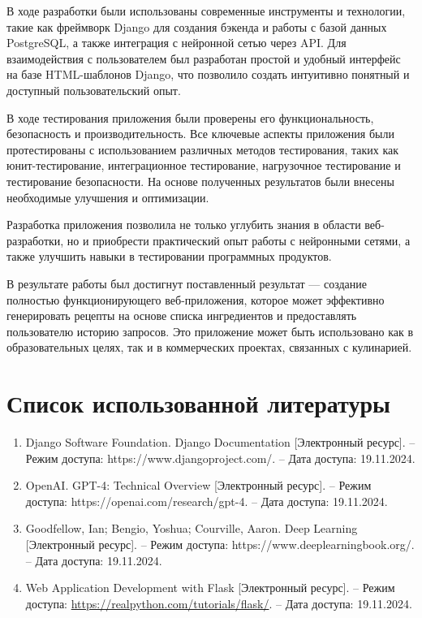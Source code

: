 {{    В ходе разработки были использованы современные инструменты и технологии, такие как фреймворк Django для создания бэкенда и работы с базой данных PostgreSQL, а также интеграция с нейронной сетью через API. Для взаимодействия с пользователем был разработан простой и удобный интерфейс на базе HTML-шаблонов Django, что позволило создать интуитивно понятный и доступный пользовательский опыт.
    
    В ходе тестирования приложения были проверены его функциональность, безопасность и производительность. Все ключевые аспекты приложения были протестированы с использованием различных методов тестирования, таких как юнит-тестирование, интеграционное тестирование, нагрузочное тестирование и тестирование безопасности. На основе полученных результатов были внесены необходимые улучшения и оптимизации.
    
    Разработка приложения позволила не только углубить знания в области веб-разработки, но и приобрести практический опыт работы с нейронными сетями, а также улучшить навыки в тестировании программных продуктов. 
    
    В результате работы был достигнут поставленный результат — создание полностью функционирующего веб-приложения, которое может эффективно генерировать рецепты на основе списка ингредиентов и предоставлять пользователю историю запросов. Это приложение может быть использовано как в образовательных целях, так и в коммерческих проектах, связанных с кулинарией.
}
\newpage


\section*{Список использованной литературы}
    \sloppy
    {
        \begin{enumerate}
           \item Django Software Foundation. Django Documentation [Электронный ресурс]. – Режим доступа: https://www.djangoproject.com/. – Дата доступа: 19.11.2024.
        \item OpenAI. GPT-4: Technical Overview [Электронный ресурс]. – Режим доступа: https://openai.com/research/gpt-4. – Дата доступа: 19.11.2024.
        \item Goodfellow, Ian; Bengio, Yoshua; Courville, Aaron. Deep Learning [Электронный ресурс]. – Режим доступа: https://www.deeplearningbook.org/. – Дата доступа: 19.11.2024.  
        \item Web Application Development with Flask [Электронный ресурс]. – Режим доступа: \url{https://realpython.com/tutorials/flask/}. – Дата доступа: 19.11.2024.  

        \end{enumerate}
    }

}